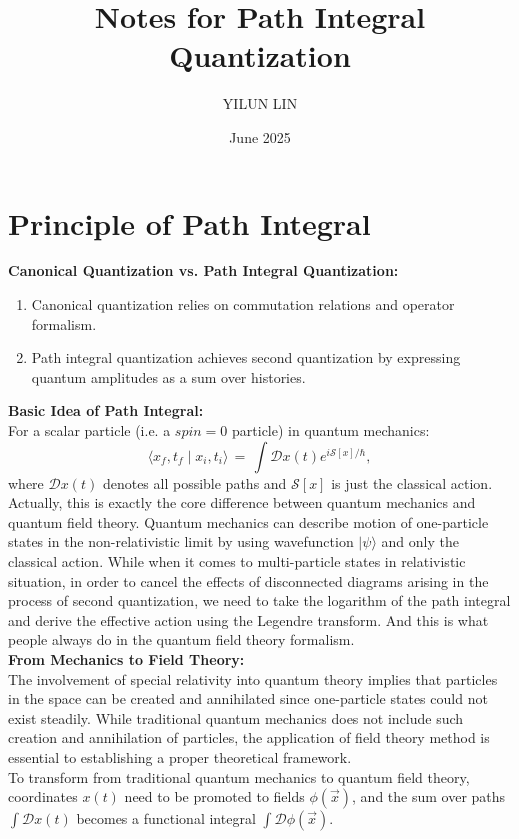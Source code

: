 \documentclass[11pt]{article}
\title{Notes for Path Integral Quantization}
\author{YILUN LIN}
\date{June 2025}
\numberwithin{equation}{section}
\begin{document}
\maketitle

\section{Principle of Path Integral}
\textbf{Canonical Quantization vs. Path Integral Quantization:}
\begin{enumerate}
    \item Canonical quantization relies on commutation relations and operator
    formalism.
    \item Path integral quantization achieves second quantization by expressing quantum amplitudes as a sum over histories.
\end{enumerate}
\textbf{Basic Idea of Path Integral:}\\
For a scalar particle (i.e. a $spin=0$ particle) in quantum mechanics:
\begin{equation}
    \langle x_f,t_f\mid x_i,t_i\rangle\,=\,\int\!\mathcal{D}x(t)e^{i\mathcal S[x]/\hbar},
\end{equation}
where $\mathcal Dx(t)$ denotes all possible paths and $\mathcal S[x]$ is just the classical action. Actually, this is exactly the core difference between quantum mechanics and quantum field theory. Quantum mechanics can describe motion of one-particle states in the non-relativistic limit by using wavefunction $\lvert\psi\rangle$ and only the classical action. While when it comes to multi-particle states in relativistic situation, in order to cancel the effects of disconnected diagrams arising in the process of second quantization, we need to take the logarithm of the path integral and derive the effective action using the Legendre transform. And this is what people always do in the quantum field theory formalism.\\[0.5em]
\textbf{From Mechanics to Field Theory:}\\
The involvement of special relativity into quantum theory implies that particles in the space can be created and annihilated since one-particle states could not exist steadily. While traditional quantum mechanics does not include such creation and annihilation of particles, the application of field theory method is essential to establishing a proper theoretical framework.\\
To transform from traditional quantum mechanics to quantum field theory, coordinates $x(t)$ need to be promoted to fields $\phi(\Vec{x})$, and the sum over paths $\int\!\mathcal Dx(t)$ becomes a functional integral $\int\!\mathcal D\phi(\Vec{x})$.\\
\end{document}
